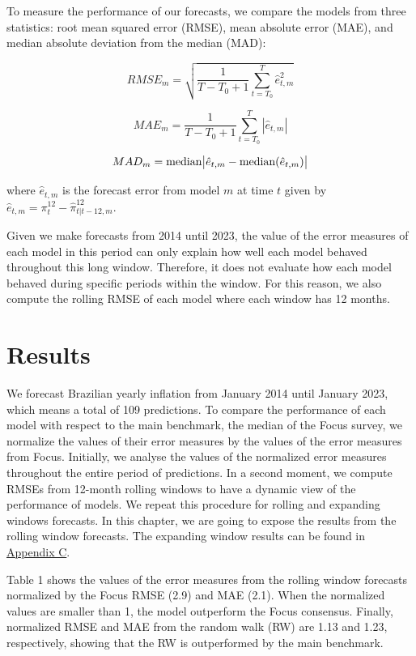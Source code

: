 \documentclass[12pt,openright,twoside,a4paper,brazil,english,emptypage,openany]{abntex2}
\begin{document}
\hspace{1em} To measure the performance of our forecasts, we compare the models from three statistics: root mean squared error (RMSE), mean absolute error (MAE), and median absolute deviation from the median (MAD):

$$RMSE_m = \sqrt{\frac{1}{T-T_0+1} \sum_{t=T_0}^T \hat{e}_{t,m}^2} $$

$$MAE_m = \frac{1}{T-T_0+1} \sum_{t=T_0}^T |\hat{e}_{t,m}|$$

$$MAD_m = \textnormal{median} \bigl\lvert \hat{e}_{t,m} - \textnormal{median}(\hat{e}_{t,m}) \bigr\rvert  $$


\hspace{-1.7em} where $\hat{e}_{t,m}$ is the forecast error from model $m$ at time $t$ given by $\hat{e}_{t,m} = \pi_t^{12} - \hat{\pi}_{t|t-12,m}^{12}$. 

Given we make forecasts from 2014 until 2023, the value of the error measures of each model in this period can only explain how well each model behaved throughout this long window. Therefore, it does not evaluate how each model behaved during specific periods within the window. For this reason, we also compute the rolling RMSE of each model where each window has 12 months.
 

\chapter{Results}

\hspace{1em} We forecast Brazilian yearly inflation from January 2014 until January  2023, which means a total of 109 predictions. To compare the performance of each model with respect to the main benchmark, the median of the Focus survey, we normalize the values of their error measures by the values of the error measures from Focus. Initially, we analyse the values of the normalized error measures throughout the entire period of predictions. In a second moment, we compute RMSEs from 12-month rolling windows to have a dynamic view of the performance of models. We repeat this procedure for rolling and expanding windows forecasts. In this chapter, we are going to expose the results from the rolling window forecasts. The expanding window results can be found in \hyperref[sec:appendix.expanding]{Appendix C}.

Table 1 shows the values of the error measures from the rolling window forecasts normalized by the Focus RMSE (2.9) and MAE (2.1). When the normalized values are smaller than 1, the model outperform the Focus consensus. Finally, normalized RMSE and MAE from the random walk (RW) are 1.13 and 1.23, respectively, showing that the RW is outperformed by the main benchmark.
\end{document}
